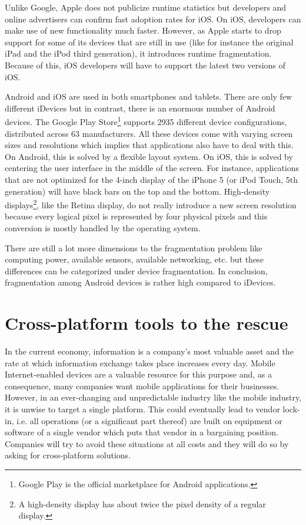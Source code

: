 Unlike Google, Apple does not publicize runtime statistics but developers \cite{Smith:2013} and online advertisers \cite{Chitika:2013} can confirm fast adoption rates for iOS. On iOS, developers can make use of new functionality much faster. However, as Apple starts to drop support for some of its devices that are still in use (like for instance the original iPad and the iPod third generation), it introduces runtime fragmentation. Because of this, iOS developers will have to support the latest two versions of iOS.

Android and iOS are used in both smartphones and tablets. There are only few different iDevices  but in contrast, there is an enormous number of Android devices. The Google Play Store\footnote{Google Play is the official marketplace for Android applications.} supports 2935 different device configurations, distributed across 63 manufacturers. All these devices come  with varying screen sizes and resolutions which implies that applications also have to deal with this. On Android, this is solved by a flexible layout system. On iOS, this is solved by centering the user interface in the middle of the screen. For instance, applications that are not optimized for the 4-inch display of the iPhone 5 (or iPod Touch, 5th generation) will have black bars on the top and the bottom. High-density displays\footnote{A high-density display has about twice the pixel density of a regular display.}, like the Retina display, do not really introduce a new screen resolution because every logical pixel is represented by four physical pixels and this conversion is mostly handled by the operating system.

There are still a lot more dimensions to the fragmentation problem like computing power, available sensors, available networking, etc. but these differences can be categorized under device fragmentation. In conclusion, fragmentation among Android devices is rather high compared to iDevices.

\section{Cross-platform tools to the rescue}

In the current economy, information is a company's most valuable asset and the rate at which information exchange takes place increases every day. Mobile Internet-enabled devices are a valuable resource for this purpose and, as a consequence, many companies want mobile applications for their businesses. However, in an ever-changing and unpredictable industry like the mobile industry, it is unwise to target a single platform. This could eventually lead to vendor lock-in, i.e. all operations (or a significant part thereof) are built on equipment or software of a single vendor which puts that vendor in a bargaining position. Companies will try to avoid these situations at all costs and they will do so by asking for cross-platform solutions. 

